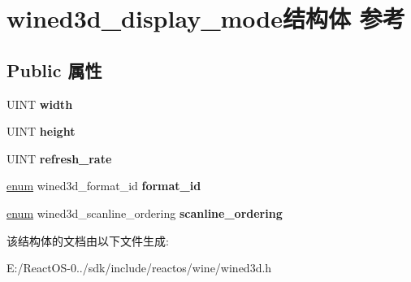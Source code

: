 \hypertarget{structwined3d__display__mode}{}\section{wined3d\+\_\+display\+\_\+mode结构体 参考}
\label{structwined3d__display__mode}
\subsection*{Public 属性}
\begin{DoxyCompactItemize}
\item 
\mbox{\label{structwined3d__display__mode_aa9333fc05a0d1ecf24d35eeb9976eb70}} 
U\+I\+NT {\bfseries width}
\item 
\mbox{\label{structwined3d__display__mode_a12881692edb482e10c7050cf18d44e6f}} 
U\+I\+NT {\bfseries height}
\item 
\mbox{\label{structwined3d__display__mode_a1439dcc6534ae0be475df216aaff17a2}} 
U\+I\+NT {\bfseries refresh\+\_\+rate}
\item 
\mbox{\label{structwined3d__display__mode_a4c78b751e03cdeaa8e75115a4ccdd6dc}} 
\hyperlink{interfaceenum}{enum} wined3d\+\_\+format\+\_\+id {\bfseries format\+\_\+id}
\item 
\mbox{\label{structwined3d__display__mode_ad3c9bb8f1c5b9a2ea0e6036c8d480c02}} 
\hyperlink{interfaceenum}{enum} wined3d\+\_\+scanline\+\_\+ordering {\bfseries scanline\+\_\+ordering}
\end{DoxyCompactItemize}


该结构体的文档由以下文件生成\+:\begin{DoxyCompactItemize}
\item 
E\+:/\+React\+O\+S-\/0../sdk/include/reactos/wine/wined3d.\+h\end{DoxyCompactItemize}
